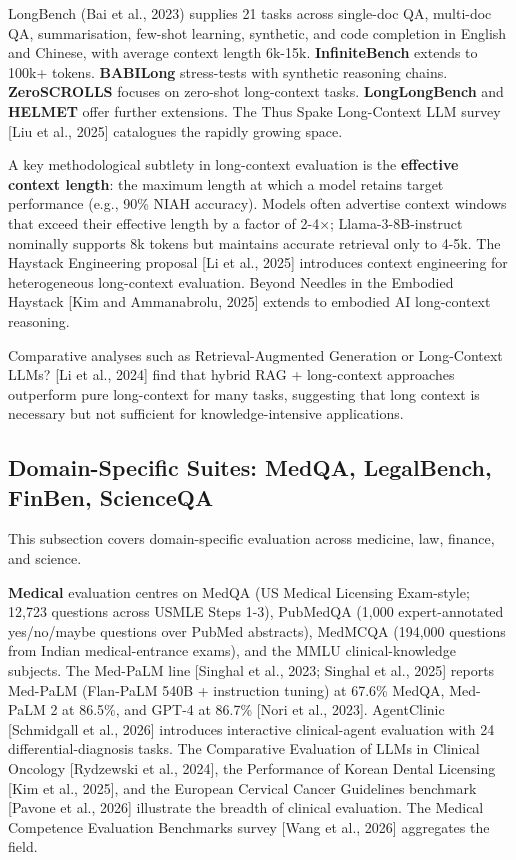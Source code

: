 LongBench (Bai et al., 2023) supplies 21 tasks across single-doc QA, multi-doc QA, summarisation, few-shot learning, synthetic, and code completion in English and Chinese, with average context length 6k-15k. \textbf{InfiniteBench} extends to 100k+ tokens. \textbf{BABILong} stress-tests with synthetic reasoning chains. \textbf{ZeroSCROLLS} focuses on zero-shot long-context tasks. \textbf{LongLongBench} and \textbf{HELMET} offer further extensions. The Thus Spake Long-Context LLM survey {[}Liu et al., 2025{]} catalogues the rapidly growing space.

A key methodological subtlety in long-context evaluation is the \textbf{effective context length}: the maximum length at which a model retains target performance (e.g., 90\% NIAH accuracy). Models often advertise context windows that exceed their effective length by a factor of 2-4×; Llama-3-8B-instruct nominally supports 8k tokens but maintains accurate retrieval only to 4-5k. The Haystack Engineering proposal {[}Li et al., 2025{]} introduces context engineering for heterogeneous long-context evaluation. Beyond Needles in the Embodied Haystack {[}Kim and Ammanabrolu, 2025{]} extends to embodied AI long-context reasoning.

Comparative analyses such as Retrieval-Augmented Generation or Long-Context LLMs? {[}Li et al., 2024{]} find that hybrid RAG + long-context approaches outperform pure long-context for many tasks, suggesting that long context is necessary but not sufficient for knowledge-intensive applications.

\subsection{Domain-Specific Suites: MedQA, LegalBench, FinBen, ScienceQA}\label{domain-specific-suites-medqa-legalbench-finben-scienceqa}

This subsection covers domain-specific evaluation across medicine, law, finance, and science.

\textbf{Medical} evaluation centres on MedQA (US Medical Licensing Exam-style; 12,723 questions across USMLE Steps 1-3), PubMedQA (1,000 expert-annotated yes/no/maybe questions over PubMed abstracts), MedMCQA (194,000 questions from Indian medical-entrance exams), and the MMLU clinical-knowledge subjects. The Med-PaLM line {[}Singhal et al., 2023; Singhal et al., 2025{]} reports Med-PaLM (Flan-PaLM 540B + instruction tuning) at 67.6\% MedQA, Med-PaLM 2 at 86.5\%, and GPT-4 at 86.7\% {[}Nori et al., 2023{]}. AgentClinic {[}Schmidgall et al., 2026{]} introduces interactive clinical-agent evaluation with 24 differential-diagnosis tasks. The Comparative Evaluation of LLMs in Clinical Oncology {[}Rydzewski et al., 2024{]}, the Performance of Korean Dental Licensing {[}Kim et al., 2025{]}, and the European Cervical Cancer Guidelines benchmark {[}Pavone et al., 2026{]} illustrate the breadth of clinical evaluation. The Medical Competence Evaluation Benchmarks survey {[}Wang et al., 2026{]} aggregates the field.

